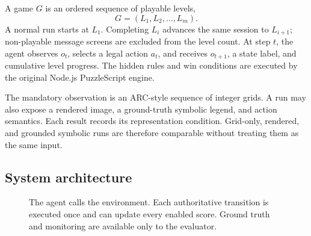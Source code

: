 \documentclass[sigconf,nonacm]{acmart}
\begin{document}
A game \(G\) is an ordered sequence of playable levels,
\[
G=(L_1,L_2,\ldots,L_m).
\]
A normal run starts at \(L_1\). Completing \(L_i\) advances the same session to
\(L_{i+1}\); non-playable message screens are excluded from the level count. At
step \(t\), the agent observes \(o_t\), selects a legal action \(a_t\), and
receives \(o_{t+1}\), a state label, and cumulative level progress. The hidden
rules and win conditions are executed by the original Node.js PuzzleScript
engine.

The mandatory observation is an ARC-style sequence of integer grids. A run may
also expose a rendered image, a ground-truth symbolic legend, and action
semantics. Each result records its representation condition. Grid-only,
rendered, and grounded symbolic runs are therefore comparable without treating
them as the same input.

\subsection{System architecture}

\begin{figure}[t]
  \centering
  \caption{The agent calls the environment. Each authoritative transition is
  executed once and can update every enabled score. Ground truth and monitoring
  are available only to the evaluator.}
  \label{fig:architecture}
\end{figure}
\end{document}
